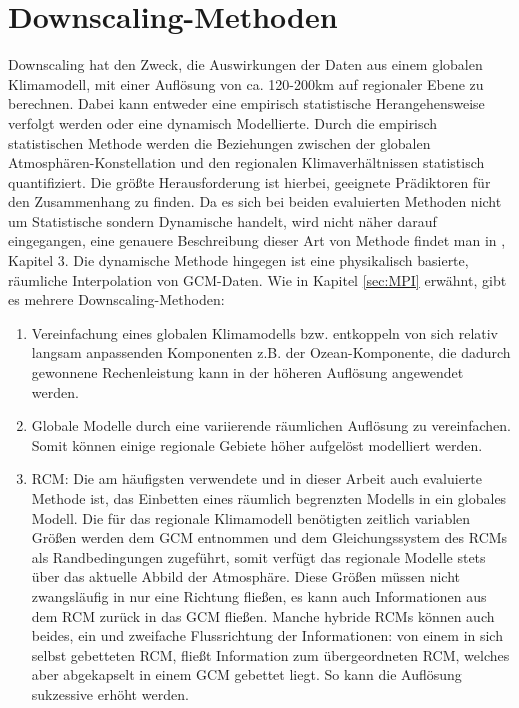 \section{Downscaling-Methoden}
Downscaling hat den Zweck, die Auswirkungen der Daten aus einem globalen Klimamodell, mit einer Auflösung von ca. 120-200km auf regionaler Ebene zu berechnen. Dabei kann entweder eine empirisch statistische Herangehensweise verfolgt werden oder eine dynamisch Modellierte. Durch die empirisch statistischen Methode werden die Beziehungen zwischen der globalen Atmosphären-Konstellation und den regionalen Klimaverhältnissen statistisch quantifiziert. Die größte Herausforderung ist hierbei, geeignete Prädiktoren für den Zusammenhang zu finden. Da es sich bei beiden evaluierten Methoden nicht um Statistische sondern Dynamische handelt, wird nicht näher darauf eingegangen, eine genauere Beschreibung dieser Art von Methode findet man in \cite{RCM}, Kapitel 3. Die dynamische Methode hingegen ist eine
physikalisch basierte, räumliche Interpolation von GCM-Daten. Wie in Kapitel \ref{sec:MPI} erwähnt, gibt es mehrere Downscaling-Methoden:
\begin{enumerate}[label=(\alph*)]
	\item Vereinfachung eines globalen Klimamodells bzw. entkoppeln von sich relativ langsam anpassenden Komponenten z.B. der Ozean-Komponente, die dadurch gewonnene Rechenleistung kann in der höheren Auflösung angewendet werden.
	\item Globale Modelle durch eine variierende räumlichen Auflösung zu vereinfachen. Somit können einige regionale Gebiete höher aufgelöst modelliert werden.
	\item RCM: Die am häufigsten verwendete und in dieser Arbeit auch evaluierte Methode ist, das Einbetten eines räumlich begrenzten Modells in ein globales Modell. Die für das regionale Klimamodell benötigten zeitlich variablen Größen werden dem GCM entnommen und dem Gleichungssystem des RCMs als Randbedingungen zugeführt, somit verfügt das regionale Modelle stets über das aktuelle Abbild der Atmosphäre. Diese Größen müssen nicht zwangsläufig in nur eine Richtung fließen, es kann auch Informationen aus dem RCM zurück in das GCM fließen. Manche hybride RCMs können auch beides, ein und zweifache Flussrichtung der Informationen: von einem in sich selbst gebetteten RCM, fließt Information zum übergeordneten RCM, welches aber abgekapselt in einem GCM gebettet liegt. So kann die Auflösung sukzessive erhöht werden. 
\end{enumerate}
